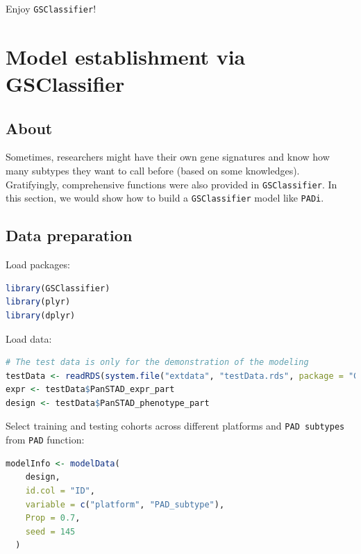 \documentclass[
  12pt,
]{book}
\newcommand{\passthrough}[1]{#1}
\begin{document}
Enjoy \passthrough{\lstinline!GSClassifier!}!

\hypertarget{model-establishment-via-gsclassifier}{%
\chapter{Model establishment via GSClassifier}\label{model-establishment-via-gsclassifier}}

\hypertarget{about-2}{%
\section{About}\label{about-2}}

Sometimes, researchers might have their own gene signatures and know how many subtypes they want to call before (based on some knowledges). Gratifyingly, comprehensive functions were also provided in \passthrough{\lstinline!GSClassifier!}. In this section, we would show how to build a \passthrough{\lstinline!GSClassifier!} model like \passthrough{\lstinline!PADi!}.

\hypertarget{data-preparation}{%
\section{Data preparation}\label{data-preparation}}

Load packages:

\begin{lstlisting}[language=R]
library(GSClassifier)
library(plyr)
library(dplyr)
\end{lstlisting}

Load data:

\begin{lstlisting}[language=R]
# The test data is only for the demonstration of the modeling
testData <- readRDS(system.file("extdata", "testData.rds", package = "GSClassifier"))
expr <- testData$PanSTAD_expr_part
design <- testData$PanSTAD_phenotype_part
\end{lstlisting}

Select training and testing cohorts across different platforms and \passthrough{\lstinline!PAD subtypes!} from \passthrough{\lstinline!PAD!} function:

\begin{lstlisting}[language=R]
modelInfo <- modelData(
    design,
    id.col = "ID",
    variable = c("platform", "PAD_subtype"),
    Prop = 0.7,
    seed = 145
  )
\end{lstlisting}
\end{document}

